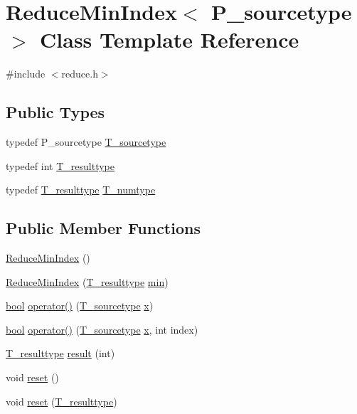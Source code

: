 \hypertarget{classReduceMinIndex}{}\section{Reduce\+Min\+Index$<$ P\+\_\+sourcetype $>$ Class Template Reference}
\label{classReduceMinIndex}


{\ttfamily \#include $<$reduce.\+h$>$}

\subsection*{Public Types}
\begin{DoxyCompactItemize}
\item 
typedef P\+\_\+sourcetype \hyperlink{classReduceMinIndex_a32f8a59b01d3624a3832598984dc4f2d}{T\+\_\+sourcetype}
\item 
typedef int \hyperlink{classReduceMinIndex_abc233796b665428682336475b539b6cf}{T\+\_\+resulttype}
\item 
typedef \hyperlink{classReduceMinIndex_abc233796b665428682336475b539b6cf}{T\+\_\+resulttype} \hyperlink{classReduceMinIndex_aec2f7360d000099b2e6b2893cf4e7430}{T\+\_\+numtype}
\end{DoxyCompactItemize}
\subsection*{Public Member Functions}
\begin{DoxyCompactItemize}
\item 
\hyperlink{classReduceMinIndex_ac43683b6d36a5b89ca387efbf6d2be5d}{Reduce\+Min\+Index} ()
\item 
\hyperlink{classReduceMinIndex_a8bdaf55461ced825186c646fd9708345}{Reduce\+Min\+Index} (\hyperlink{classReduceMinIndex_abc233796b665428682336475b539b6cf}{T\+\_\+resulttype} \hyperlink{vecbfn_8cc_aa3e27e02424d28adfcf9d2b934e741a1}{min})
\item 
\hyperlink{compiler_8h_abb452686968e48b67397da5f97445f5b}{bool} \hyperlink{classReduceMinIndex_ac6d157125e562b4d4c7f17c635f7f80a}{operator()} (\hyperlink{classReduceMinIndex_a32f8a59b01d3624a3832598984dc4f2d}{T\+\_\+sourcetype} \hyperlink{vecnorm1_8cc_ac73eed9e41ec09d58f112f06c2d6cb63}{x})
\item 
\hyperlink{compiler_8h_abb452686968e48b67397da5f97445f5b}{bool} \hyperlink{classReduceMinIndex_abfa6dd8bf47674344ac8ba5e2b4acc7b}{operator()} (\hyperlink{classReduceMinIndex_a32f8a59b01d3624a3832598984dc4f2d}{T\+\_\+sourcetype} \hyperlink{vecnorm1_8cc_ac73eed9e41ec09d58f112f06c2d6cb63}{x}, int index)
\item 
\hyperlink{classReduceMinIndex_abc233796b665428682336475b539b6cf}{T\+\_\+resulttype} \hyperlink{classReduceMinIndex_a06228ead375b12ec22c23d60ef51097b}{result} (int)
\item 
void \hyperlink{classReduceMinIndex_afab1a9d05fc9256186146d487d6b1063}{reset} ()
\item 
void \hyperlink{classReduceMinIndex_a14ab4a87028333c55ef9c8a20c5c5d1a}{reset} (\hyperlink{classReduceMinIndex_abc233796b665428682336475b539b6cf}{T\+\_\+resulttype})
\end{DoxyCompactItemize}
